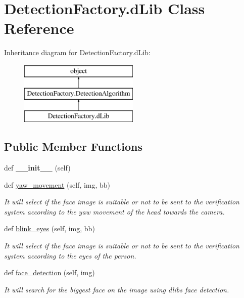 \hypertarget{classDetectionFactory_1_1dLib}{}\section{Detection\+Factory.\+d\+Lib Class Reference}
\label{classDetectionFactory_1_1dLib}
Inheritance diagram for Detection\+Factory.\+d\+Lib\+:\begin{figure}[H]
\begin{center}
\leavevmode
\includegraphics[height=3.000000cm]{classDetectionFactory_1_1dLib}
\end{center}
\end{figure}
\subsection*{Public Member Functions}
\begin{DoxyCompactItemize}
\item 
def {\bfseries \+\_\+\+\_\+init\+\_\+\+\_\+} (self)\hypertarget{classDetectionFactory_1_1dLib_a4fe5ff66e99a50f2e8dc4f5849811ab7}{}\label{classDetectionFactory_1_1dLib_a4fe5ff66e99a50f2e8dc4f5849811ab7}

\item 
def \hyperlink{classDetectionFactory_1_1dLib_af0883422470f60d8a9665b1004ec4acb}{yaw\+\_\+movement} (self, img, bb)
\begin{DoxyCompactList}\small\item\em It will select if the face image is suitable or not to be sent to the verification system according to the yaw movement of the head towards the camera. \end{DoxyCompactList}\item 
def \hyperlink{classDetectionFactory_1_1dLib_a52deb7c6b98fe94459c6521b876b0db9}{blink\+\_\+eyes} (self, img, bb)
\begin{DoxyCompactList}\small\item\em It will select if the face image is suitable or not to be sent to the verification system according to the eyes of the person. \end{DoxyCompactList}\item 
def \hyperlink{classDetectionFactory_1_1dLib_a49e2cf8b779ef27219d8fe20ae8951e5}{face\+\_\+detection} (self, img)
\begin{DoxyCompactList}\small\item\em It will search for the biggest face on the image using dlib\textquotesingle{}s face detection. \end{DoxyCompactList}\end{DoxyCompactItemize}
